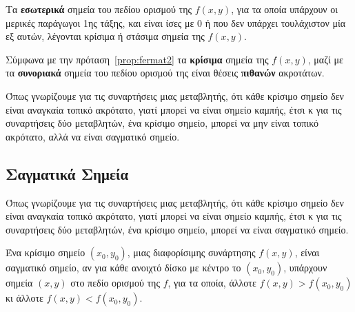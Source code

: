\documentclass[a4paper,table]{report}
\begin{document}
\begin{dfn}
  Τα \textbf{εσωτερικά} σημεία του πεδίου ορισμού της $ f(x,y) $, για τα οποία 
  υπάρχουν οι μερικές παράγωγοι 1ης τάξης, και είναι ίσες με 0 ή που δεν υπάρχει 
  τουλάχιστον μία εξ αυτών, λέγονται \textcolor{Col1}{κρίσιμα} ή
  \textcolor{Col1}{στάσιμα} σημεία της $ f(x,y) $. 
\end{dfn}

\begin{rem}
  Σύμφωνα με την πρόταση~\ref{prop:fermat2} τα \textbf{κρίσιμα} σημεία της $ f(x,y) $, 
  μαζί με τα \textbf{συνοριακά} σημεία του πεδίου ορισμού της είναι θέσεις \textbf{πιθανών} ακροτάτων.
\end{rem}

Όπως γνωρίζουμε για τις συναρτήσεις μιας μεταβλητής, ότι κάθε κρίσιμο σημείο δεν είναι 
αναγκαία τοπικό ακρότατο, γιατί μπορεί να είναι σημείο καμπής, έτσι κ για τις
συναρτήσεις δύο μεταβλητών, ένα κρίσιμο σημείο, μπορεί να μην είναι τοπικό ακρότατο,
αλλά να είναι σαγματικό σημείο.


\subsection{Σαγματικά Σημεία}

Όπως γνωρίζουμε για τις συναρτήσεις μιας μεταβλητής, ότι κάθε κρίσιμο σημείο δεν είναι 
αναγκαία τοπικό ακρότατο, γιατί μπορεί να είναι σημείο καμπής, έτσι κ για τις
συναρτήσεις δύο μεταβλητών, ένα κρίσιμο σημείο, μπορεί να είναι σαγματικό σημείο.

\begin{mybox1}
\begin{dfn}
  Ένα κρίσιμο σημείο $ (x_{0}, y_{0}) $, μιας διαφορίσιμης συνάρτησης $ f(x,y) $, είναι
  \textcolor{Col1}{σαγματικό σημείο}, αν για κάθε ανοιχτό δίσκο με κέντρο το 
  $ (x_{0}, y_{0}) $, υπάρχουν σημεία $ (x,y) $ στο πεδίο ορισμού της $f$, για τα 
  οποία, άλλοτε $ f(x,y) > f(x_{0}, y_{0}) $ κι άλλοτε $ f(x,y) < f(x_{0}, y_{0}) $. 
\end{dfn}
\end{mybox1}
\end{document}
